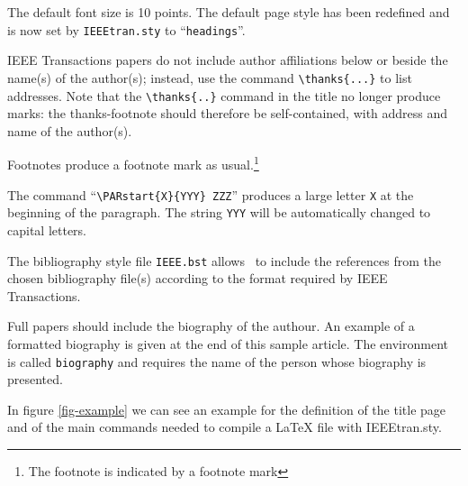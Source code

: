 The default font size is 10 points.  The default page style has been
redefined and is now set by {\tt IEEEtran.sty} to ``\verb+headings+''.

IEEE Transactions papers do not include author affiliations below or beside
the name(s) of the author(s); instead, use the command
\verb+\thanks{...}+ to list addresses. Note that the
\verb+\thanks{..}+ command in the title no longer produce marks:
the thanks-footnote should therefore be self-contained, with address
and name of the author(s).

Footnotes produce a footnote mark as usual.\footnote{The footnote is
indicated by a footnote mark}

The command ``\verb+\PARstart{X}{YYY} ZZZ+'' produces a large letter
\verb+X+ at the beginning of the paragraph. The string \verb+YYY+
will be automatically changed to capital letters.

The bibliography style file {\tt IEEE.bst} allows \BibTeX\ to include
the references from the chosen bibliography file(s) according to the
format required by IEEE Transactions.

Full papers should include the biography of the authour.
An example of a formatted biography is given at the end of
this sample article.
The environment is called \verb+biography+ and requires the
name of the person whose bio\-graphy is presented.

In figure \ref{fig-example} we can see an example for the definition of
the title page and of the main commands needed to compile a \LaTeX
file with IEEEtran.sty.

